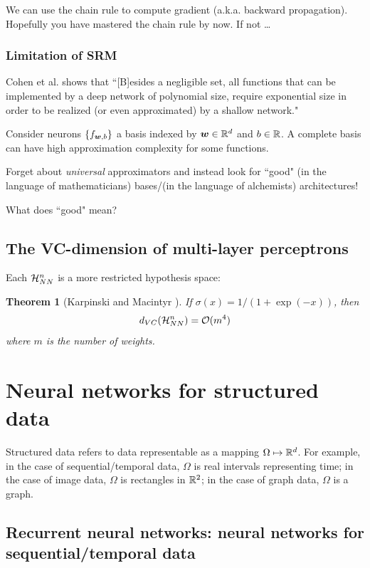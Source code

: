 \documentclass{article}
\newtheorem{theorem}{Theorem}
\begin{document}
We can use the chain rule to compute gradient (a.k.a. backward propagation).
Hopefully you have mastered the chain rule by now. If not \ldots

\subsubsection{Limitation of SRM}

Cohen et al. shows that ``[B]esides a negligible set, all functions that can be implemented by a deep network of polynomial size, require exponential size in order to be realized (or even approximated) by a shallow network."\cite{cohen2016expressive}

Consider neurons $\{f_{{\bm w}, b}\}$ a basis indexed by ${\bm w} \in {\mathbb R}^d$ and $b \in {\mathbb R}$.
A complete basis can have high approximation complexity for some functions.

Forget about \emph{universal} approximators and instead look for ``good" (in the language of mathematicians) bases/(in the language of alchemists) architectures!

What does ``good" mean?

\subsection{The VC-dimension of multi-layer perceptrons}

Each ${\mathcal H}_{NN}^n$ is a more restricted hypothesis space:
\begin{theorem}[Karpinski and Macintyr \cite{maass1995vapnik}]
If $\sigma (x) = 1 / (1 + \exp (-x))$, then
\[
d_{VC} ({\mathcal H}_{NN}^n) = {\mathcal O} (m^4)
\]
where $m$ is the number of weights.
\end{theorem}

\section{Neural networks for structured data}

Structured data refers to data representable as a mapping $\Omega \mapsto {\mathbb R}^d$.
For example, in the case of sequential/temporal data, $\Omega$ is real intervals representing time;
in the case of image data, $\Omega$ is rectangles in ${\mathbb R}^2$;
in the case of graph data, $\Omega$ is a graph.

\subsection{Recurrent neural networks: neural networks for sequential/temporal data}
\end{document}
